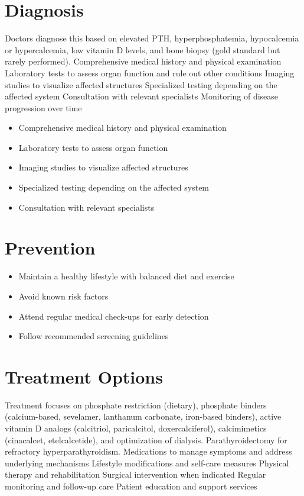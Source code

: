 \section{Diagnosis}
Doctors diagnose this based on elevated PTH, hyperphosphatemia, hypocalcemia or hypercalcemia, low vitamin D levels, and bone biopsy (gold standard but rarely performed). Comprehensive medical history and physical examination Laboratory tests to assess organ function and rule out other conditions Imaging studies to visualize affected structures Specialized testing depending on the affected system Consultation with relevant specialists Monitoring of disease progression over time

\begin{itemize}[noitemsep]
  \item Comprehensive medical history and physical examination
  \item Laboratory tests to assess organ function
  \item Imaging studies to visualize affected structures
  \item Specialized testing depending on the affected system
  \item Consultation with relevant specialists
\end{itemize}
\section{Prevention}
\begin{itemize}[noitemsep]
  \item Maintain a healthy lifestyle with balanced diet and exercise
  \item Avoid known risk factors
  \item Attend regular medical check-ups for early detection
  \item Follow recommended screening guidelines
\end{itemize}
\section{Treatment Options}
Treatment focuses on phosphate restriction (dietary), phosphate binders (calcium-based, sevelamer, lanthanum carbonate, iron-based binders), active vitamin D analogs (calcitriol, paricalcitol, doxercalciferol), calcimimetics (cinacalcet, etelcalcetide), and optimization of dialysis. Parathyroidectomy for refractory hyperparathyroidism. Medications to manage symptoms and address underlying mechanisms Lifestyle modifications and self-care measures Physical therapy and rehabilitation Surgical intervention when indicated Regular monitoring and follow-up care Patient education and support services

